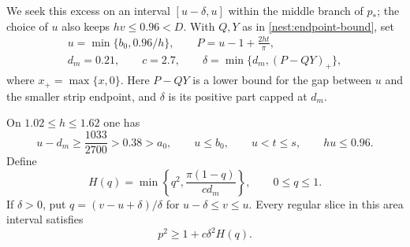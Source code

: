 We seek this excess on an interval $[u-\delta,u]$ within the middle
branch of $p_*$; the choice of $u$ also keeps $hv\leq0.96<D$.
With $Q,Y$ as in \eqref{nest:endpoint-bound}, set
\begin{equation}\label{nest:gain-parameters}
 \begin{gathered}
 u=\min\{b_0,0.96/h\},\qquad
 P=u-1+\frac{2ht}{\pi},\\
 d_m=0.21,\qquad c=2.7,\qquad
 \delta=\min\{d_m,(P-QY)_+\},
 \end{gathered}
\end{equation}
where $x_+=\max\{x,0\}$.
Here $P-QY$ is a lower bound for the gap between $u$ and the smaller
strip endpoint, and $\delta$ is its positive part capped at $d_m$.

\begin{lemma}
\label{nest:shape-gain}
On $1.02\leq h\leq1.62$ one has
\begin{equation}\label{nest:interval-placement}
 u-d_m\geq\frac{1033}{2700}>0.38>a_0,
 \qquad u\leq b_0,\qquad u<t\leq s,\qquad hu\leq0.96.
\end{equation}
Define
\begin{equation}\label{nest:shape-function}
 H(q)=\min\left\{q^2,\frac{\pi(1-q)}{c d_m}\right\},
 \qquad 0\leq q\leq1.
\end{equation}
If $\delta>0$, put $q=(v-u+\delta)/\delta$ for
$u-\delta\leq v\leq u$. Every regular slice in this area interval satisfies
\begin{equation}\label{nest:improved-perimeter}
 p^2\geq1+c\delta^2H(q).
\end{equation}
\end{lemma}


